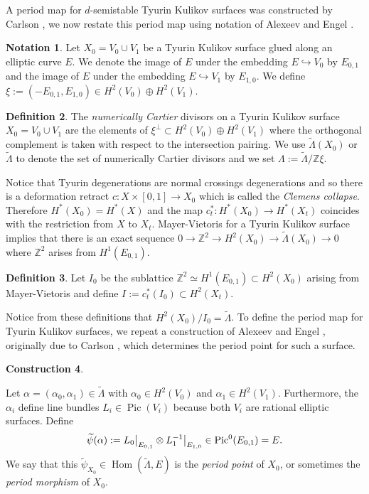 \documentclass[a4paper]{amsart}
\theoremstyle{definition}
\newtheorem{defn}{Definition}[section]
\newtheorem{notation}[defn]{Notation}
\newtheorem{construct}[defn]{Construction}
\theoremstyle{plain}
\theoremstyle{remark}
\newcommand{\Z}{\mathbb{Z}}
\begin{document}
A period map for $d$-semistable Tyurin Kulikov surfaces was constructed by Carlson \cite{Carlson85}, we now restate this period map using notation of Alexeev and Engel \cite{AE23}. 

\begin{notation}
Let $X_0 = V_0\cup V_1$ be a Tyurin Kulikov surface glued along an elliptic curve $E$. We denote the image of $E$ under the embedding $E\hookrightarrow V_0$ by $E_{0,1}$ and the image of $E$ under the embedding $E \hookrightarrow V_1$ by $E_{1,0}$. We define $\xi:=(-E_{0,1},E_{1,0})\in H^2(V_0)\oplus H^2(V_1)$.
\end{notation}
\begin{defn}
The \emph{numerically Cartier} divisors on a Tyurin Kulikov surface $X_0=V_0\cup V_1$ are the elements of $\xi^\perp\subset H^2(V_0)\oplus H^2(V_1)$ where the orthogonal complement is taken with respect to the intersection pairing. We use $\widetilde{\Lambda}(X_0)$ or $\widetilde{\Lambda}$ to denote the set of numerically Cartier divisors and we set $\Lambda:=\widetilde{\Lambda}/\Z\xi$.
\end{defn}

Notice that Tyurin degenerations are normal crossings degenerations and so there is a deformation retract $c:X\times[0,1]\rightarrow X_0$ which is called the \emph{Clemens collapse}. Therefore $H^*(X_0)=H^*(X)$ and the map $c_t^*:H^*(X_0)\rightarrow H^*(X_t)$ coincides with the restriction from $X$ to $X_t$. Mayer-Vietoris for a Tyurin Kulikov surface implies that there is an exact sequence $0\rightarrow\Z^2\rightarrow H^2(X_0)\rightarrow \widetilde{\Lambda}(X_0)\rightarrow 0$ where $\Z^2$ arises from $H^1(E_{0,1})$. 

\begin{defn}
Let $I_0$ be the sublattice $\Z^2\simeq H^1(E_{0,1})\subset H^2(X_0)$ arising from Mayer-Vietoris and define $I:=c_t^*(I_0)\subset H^2(X_t)$.
\end{defn}

Notice from these definitions that $H^2(X_0)/I_0=\widetilde{\Lambda}$. To define the period map for Tyurin Kulikov surfaces, we repeat a construction of Alexeev and Engel \cite[Construction 4.3]{AE23}, originally due to Carlson \cite{Carlson85}, which determines the period point for such a surface. 

\begin{construct}\label{construct:period point}

Let $\alpha=(\alpha_0,\alpha_1)\in\widetilde{\Lambda}$ with $\alpha_0\in H^2(V_0)$ and $\alpha_1\in H^2(V_1)$. Furthermore, the $\alpha_i$ define line bundles $L_i\in \operatorname{Pic}(V_i)$ because both $V_i$ are rational elliptic surfaces. Define $$\widetilde{\psi}(\alpha):=L_0\big{|}_{E_{0,1}}\otimes L_1^{-1}\big{|}_{E_{1,0}}\in\operatorname{Pic}^0(E_{0,1})=E.$$
We say that this $\widetilde{\psi}_{X_0} \in \operatorname{Hom}(\widetilde{\Lambda},E)$ is the \emph{period point} of $X_0$, or sometimes the \emph{period morphism} of $X_0$.

\end{construct}
\end{document}
